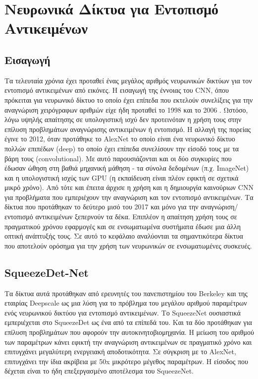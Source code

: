 \chapter{Νευρωνικά Δίκτυα για Εντοπισμό Αντικειμένων}%
\label{chapter:neuralNets}
\section{Εισαγωγή}
Τα τελευταία χρόνια έχει προταθεί ένας μεγάλος αριθμός νευρωνικών δικτύων για τον εντοπισμό αντικειμένων από εικόνες. Η εισαγωγή της έννοιας του CNN, όπου πρόκειται για νευρωνικό δίκτυο το οποίο έχει επίπεδα που εκτελούν συνελίξεις για την αναγνώριση χειρόγραφων αριθμών είχε ήδη προταθεί το 1998 \cite{36} και το 2006 \cite{35}. Ωστόσο, λόγω υψηλής απαίτησης σε υπολογιστική ισχύ δεν προτεινόταν η χρήση τους στην επίλυση προβλημάτων αναγνώρισης αντικειμένων ή εντοπισμό. Η αλλαγή της πορείας έγινε το 2012, όταν προτάθηκε το AlexNet \cite{20} το οποίο είναι ένα νευρωνικό δίκτυο πολλών επιπέδων (deep) το οποίο έχει επίπεδα συνελίσουν την είσοδό τους με τα βάρη τους (convolutional). Με αυτό παρουσιάζονται και οι δύο συγκυρίες που έδωσαν ώθηση στη βαθιά μηχανική μάθηση - τα σύνολα δεδομένων (π.χ. ImageNet) και η υπολογιστική ισχύς των GPU (η εκπαίδευση είναι πλέον εφικτή σε σχετικά μικρό χρόνο). Από τότε και έπειτα άρχισε η χρήση και η δημιουργία καινούριων CNN για προβλήματα που εμπεριέχουν την αναγνώριση και τον εντοπισμό αντικειμένων. Τα δίκτυα που προτάθηκαν το δεύτερο μισό του 2017 και μόνο για την αναγνώριση/εντοπισμό αντικειμένων ξεπερνούν τα δέκα. Επιπλέον η απαίτηση χρήση τους σε πραγματικού χρόνου εφαρμογές και σε ενσωματωμένα συστήματα έδωσε μια άλλη οπτική ανάπτυξής τους. Σε αυτό το κεφάλαιο αναλύονται τα σημαντικότερα δίκτυα που αποτελούν ορόσημα για την χρήση των νευρωνικών σε ενσωματωμένες συσκευές.


\section{SqueezeDet-Net \cite{1} \cite{2}}
Τα δίκτυα αυτά προτάθηκαν από ερευνητές του πανεπιστημίου του Berkeley και της εταιρίας Deepscale ως μια λύση για το πρόβλημα του μεγάλου αριθμού παραμέτρων ενός νευρωνικού δικτύου για εντοπισμό αντικειμένων. Το SqueezeΝet ουσιαστικά εμπεριέχεται στο SqueezeDet ως ένα από τα επίπεδά του. Και τα δύο προτάθηκαν για επίλυση προβλημάτων που αφορούν την αυτοκινητοβιομηχανία. Η μείωση του αριθμού των παραμέτρων κάνει εφικτή την αναγνώριση αντικειμένων σε πραγματικό χρόνο και επιτυγχάνει μεγαλύτερη ενεργειακή αποδοτικότητα. Σε σύγκριση με το AlexNet\cite{20}, επιτυγχάνει την ίδια ακρίβεια με 50x μικρότερο μέγεθος παραμέτρων. Η είσοδος που δέχεται είναι το ήδη επεξεργασμένο αποτέλεσμα του SqueezeNet.

